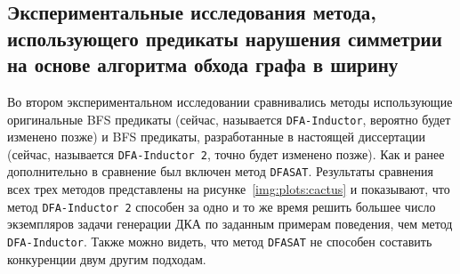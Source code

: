 \begin{table}[ht]
  \caption{Медианное время работы методов генерации ДКА по заданным примерам поведения с использованием BFS предикатов нарушения симметрии, DFS предикатов нарушения симметрии и метода \texttt{DFASAT} в секундах. Время работы методов было ограничено одним часом ($\text{TL} = 3600\,\, \text{секунд}$)}
  \centering
  \label{tab:DFS-results}
\end{table}


\subsection{Экспериментальные исследования метода, использующего предикаты нарушения симметрии на основе алгоритма обхода графа в ширину}
\label{sec:space:results:bfs}

Во втором экспериментальном исследовании сравнивались методы использующие оригинальные BFS предикаты (сейчас, называется \texttt{DFA-Inductor}, вероятно будет изменено позже) и BFS предикаты, разработанные в настоящей диссертации (сейчас, называется \texttt{DFA-Inductor~2}, точно будет изменено позже).
Как и ранее дополнительно в сравнение был включен метод \texttt{DFASAT}.
Результаты сравнения всех трех методов представлены на рисунке~\ref{img:plots:cactus} и показывают, что метод \texttt{DFA-Inductor~2} способен за одно и то же время решить большее число экземпляров задачи генерации ДКА по заданным примерам поведения, чем метод \texttt{DFA-Inductor}.
Также можно видеть, что метод \texttt{DFASAT} не способен составить конкуренции двум другим подходам.

